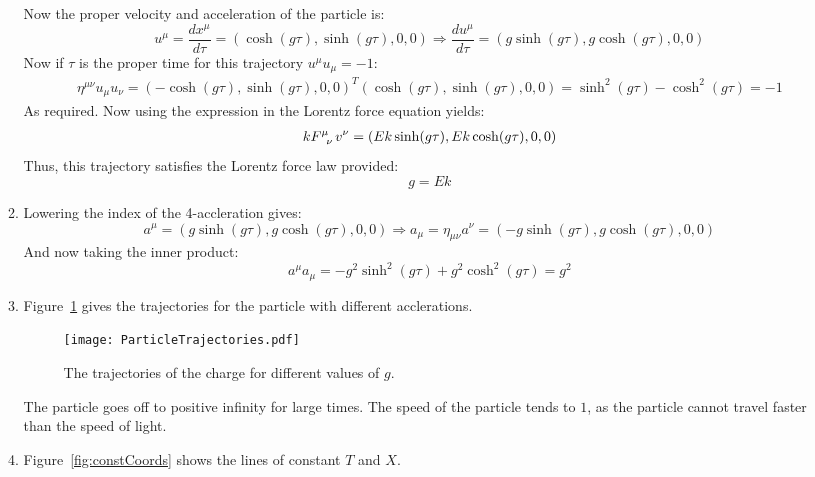 \documentclass[12pt,a4]{article}
\begin{document}
\begin{enumerate}
\begin{enumerate}
        Now the proper velocity and acceleration of the particle is:
        \begin{equation*}
          u^\mu = \frac{d x^\mu}{d \tau} = (\cosh(g \tau), \sinh(g \tau), 0, 0) \Rightarrow \frac{d u^\mu}{d \tau} = (g \sinh(g \tau), g\cosh(g \tau), 0, 0)
        \end{equation*}
        Now if $\tau$ is the proper time for this trajectory $u^\mu u_\mu  = -1$:
        \begin{align*}
          \eta^{\mu\nu}u_\mu u_\nu = (-\cosh(g \tau), \sinh(g \tau), 0, 0)^T (\cosh(g \tau), \sinh(g \tau), 0, 0) = \sinh^2(g\tau) - \cosh^2(g \tau) = -1
        \end{align*}
        As required.
        Now using the expression in the Lorentz force equation yields:
        \begin{align*}
          k\tensor{F}{^\mu_\nu}v^\nu = (Ek\sinh(g \tau), Ek\cosh(g \tau), 0, 0)
        \end{align*}
        Thus, this trajectory satisfies the Lorentz force law provided:
        \begin{equation*}
          g = Ek
        \end{equation*}
      \item
        Lowering the index of the 4-accleration gives:
        \begin{equation*}
          a^\mu = (g \sinh(g \tau), g\cosh(g \tau), 0, 0) \Rightarrow a_\mu = \eta_{\mu\nu}a^\nu = (-g \sinh(g \tau), g\cosh(g \tau), 0, 0)
        \end{equation*}
        And now taking the inner product:
        \begin{equation*}
          a^\mu a_\mu = -g^2 \sinh^2(g \tau) + g^2\cosh^2(g \tau) = g^2
        \end{equation*}
      \item
        Figure~\ref{fig:partTrajectories} gives the trajectories for the particle with different acclerations.
        \begin{figure}[H]
          \centering
          \texttt{[image: ParticleTrajectories.pdf]}
          \caption{The trajectories of the charge for different values of $g$.}
          \label{fig:partTrajectories}
        \end{figure}
        The particle goes off to positive infinity for large times.
        The speed of the particle tends to $1$, as the particle cannot travel faster than the speed of light.
      \item
        Figure~\ref{fig:constCoords} shows the lines of constant $T$ and $X$.

\end{enumerate}
\end{enumerate}
\end{document}
